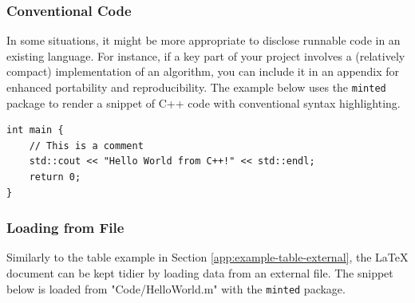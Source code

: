 \subsubsection{Conventional Code}

In some situations, it might be more appropriate to disclose runnable code in an existing language.
For instance, if a key part of your project involves a (relatively compact) implementation of an algorithm, you can include it in an appendix for enhanced portability and reproducibility.
The example below uses the \verb|minted| package to render a snippet of C++ code with conventional syntax highlighting.


\begin{verbatim}
int main {
    // This is a comment
    std::cout << "Hello World from C++!" << std::endl;
    return 0;
}
\end{verbatim}

\subsubsection{Loading from File}

Similarly to the table example in Section \ref{app:example-table-external}, the LaTeX document can be kept tidier by loading data from an external file.
The snippet below is loaded from "Code/HelloWorld.m" with the \verb|minted| package.

\inputminted[breaklines, bgcolor=bg]{Matlab}{./Code/HelloWorld.m}

